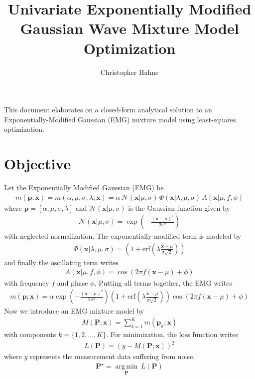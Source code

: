 \documentclass{article}
\title{Univariate Exponentially Modified Gaussian Wave Mixture Model Optimization}
\author{Christopher Hahne}
\begin{document}
\maketitle

This document elaborates on a closed-form analytical solution to an Exponentially-Modified Gaussian (EMG) mixture model using least-squares optimization.

\section{Objective}
Let the Exponentially Modified Gaussian (EMG) be
\begin{align}
m(\mathbf{p}; \mathbf{x})=m(\alpha, \mu, \sigma,\lambda;\mathbf{x})= \alpha\,\mathcal{N}(\mathbf{x}|\mu,\sigma) \, \Phi(\mathbf{x}|\lambda,\mu,\sigma) \, A(\mathbf{x}|\mu,f,\phi)
\end{align}
where $\mathbf{p}=\left[\alpha,\mu,\sigma,\lambda\right]$ and $\mathcal{N}(\mathbf{x}|\mu,\sigma)$ is the Gaussian function given by
\begin{align}
\mathcal{N}(\mathbf{x}|\mu,\sigma)=%
\exp\left(-\frac{\left(\mathbf{x}-\mu\right)^2}{2\sigma^2}\right)
\end{align}
with neglected normalization. The exponentially-modified term is modeled by
\begin{align}
\Phi(\mathbf{x}|\lambda,\mu,\sigma)=\left(1+ \text{erf}\left(\lambda\frac{\mathbf{x}-\mu}{\sigma\sqrt{2}}\right)\right)
\end{align}
and finally the oscillating term writes
\begin{align}
A(\mathbf{x}|\mu,f,\phi) = \cos\left(2 \pi f \left(\mathbf{x} - \mu\right) + \phi\right)
\end{align}
with frequency $f$ and phase $\phi$. Putting all terms together, the EMG writes
\begin{align}
m(\mathbf{p};\mathbf{x})=\alpha %
\exp\left(-\frac{\left(\mathbf{x}-\mu\right)^2}{2\sigma^2}\right) \left(1 + \text{erf}\left(\lambda\frac{\mathbf{x}-\mu}{\sigma\sqrt{2}}\right)\right) \cos\left(2 \pi f \left(\mathbf{x} - \mu\right) + \phi\right)
\end{align}
Now we introduce an EMG mixture model by
\begin{align}
M\left(\mathbf{P};\mathbf{x}\right)=\sum_{k=1}^K m\left(\mathbf{p}_k;\mathbf{x}\right)
\end{align}
with components $k=\{1,2,\dots,K\}$. For minimization, the loss function writes
\begin{align}
L\left(\mathbf{P}\right)=\left(y-M\left(\mathbf{P};\mathbf{x}\right)\right)^2
\end{align}
where $y$ represents the measurement data suffering from noise.
\begin{align}
\mathbf{P}^\star=\underset{\mathbf{P}}{\operatorname{arg\,min}} \, L\left(\mathbf{P}\right)
\end{align}
\end{document}
